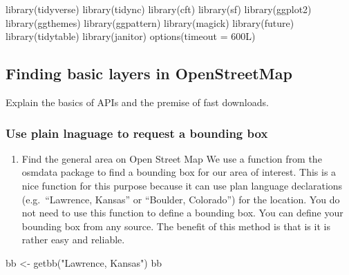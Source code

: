 \documentclass[
  paper=a4,
  ,captions=tableheading
]{scrartcl}
\newenvironment{Shaded}{\begin{snugshade}}{\end{snugshade}}
\newcommand{\AttributeTok}[1]{\textcolor[rgb]{0.77,0.63,0.00}{#1}}
\newcommand{\FunctionTok}[1]{\textcolor[rgb]{0.00,0.00,0.00}{#1}}
\newcommand{\NormalTok}[1]{#1}
\newcommand{\OtherTok}[1]{\textcolor[rgb]{0.56,0.35,0.01}{#1}}
\newcommand{\StringTok}[1]{\textcolor[rgb]{0.31,0.60,0.02}{#1}}
\providecommand{\tightlist}{%
  \setlength{\itemsep}{0pt}\setlength{\parskip}{0pt}}
\begin{document}
\begin{Shaded}
\begin{Highlighting}[]
\FunctionTok{library}\NormalTok{(tidyverse)}
\FunctionTok{library}\NormalTok{(tidync)}
\FunctionTok{library}\NormalTok{(cft)}
\FunctionTok{library}\NormalTok{(sf)}
\FunctionTok{library}\NormalTok{(ggplot2)}
\FunctionTok{library}\NormalTok{(ggthemes)}
\FunctionTok{library}\NormalTok{(ggpattern)}
\FunctionTok{library}\NormalTok{(magick)}
\FunctionTok{library}\NormalTok{(future)}
\FunctionTok{library}\NormalTok{(tidytable)}
\FunctionTok{library}\NormalTok{(janitor)}
\FunctionTok{options}\NormalTok{(}\AttributeTok{timeout =}\NormalTok{ 600L)}
\end{Highlighting}
\end{Shaded}

\hypertarget{finding-basic-layers-in-openstreetmap}{%
\subsection{Finding basic layers in
OpenStreetMap}\label{finding-basic-layers-in-openstreetmap}}

Explain the basics of APIs and the premise of fast downloads.

\hypertarget{use-plain-lnaguage-to-request-a-bounding-box}{%
\subsubsection{Use plain lnaguage to request a bounding
box}\label{use-plain-lnaguage-to-request-a-bounding-box}}

\begin{enumerate}
\def\labelenumi{\arabic{enumi}.}
\tightlist
\item
  Find the general area on Open Street Map We use a function from the
  osmdata package to find a bounding box for our area of interest. This
  is a nice function for this purpose because it can use plan language
  declarations (e.g.~``Lawrence, Kansas'' or ``Boulder, Colorado'') for
  the location. You do not need to use this function to define a
  bounding box. You can define your bounding box from any source. The
  benefit of this method is that is it is rather easy and reliable.
\end{enumerate}

\begin{Shaded}
\begin{Highlighting}[]
\NormalTok{bb }\OtherTok{\textless{}{-}} \FunctionTok{getbb}\NormalTok{(}\StringTok{"Lawrence, Kansas"}\NormalTok{)}
\NormalTok{bb}
\end{Highlighting}
\end{Shaded}
\end{document}
